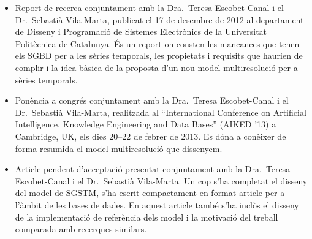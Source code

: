 \begin{itemize}

\item Report de recerca \parencite{llusa12:report} conjuntament amb la
  Dra.\ Teresa Escobet-Canal i el Dr.\ Sebastià Vila-Marta, publicat el 17 de
  desembre de 2012 al departament de Disseny i Programació de Sistemes
  Electrònics de la Universitat Politècnica de Catalunya. És un report
  on consten les mancances que tenen els \gls{SGBD} per a les sèries
  temporals, les propietats i requisits que haurien de complir i la
  idea bàsica de la proposta d'un nou model multiresolució per a
  sèries temporals.

\item Ponència a congrés \parencite{llusa13:aiked} conjuntament amb la
  Dra.\ Teresa Escobet-Canal i el Dr.\ Sebastià Vila-Marta, realitzada
  al ``International Conference on Artificial Intelligence, Knowledge
  Engineering and Data Bases'' (AIKED '13) a Cambridge, UK, els dies
  20--22 de febrer de 2013.  Es dóna a conèixer de forma resumida el
  model multiresolució que dissenyem.


\item Article pendent d'acceptació presentat conjuntament amb la Dra.\
  Teresa Escobet-Canal i el Dr.\ Sebastià Vila-Marta. Un cop s'ha
  completat el disseny del model de \gls{SGSTM}, s'ha escrit
  compactament en format article per a l'àmbit de les bases de dades.
  En aquest article també s'ha inclòs el disseny de la implementació
  de referència dels model i la motivació del treball comparada amb
  recerques similars.


\end{itemize}















